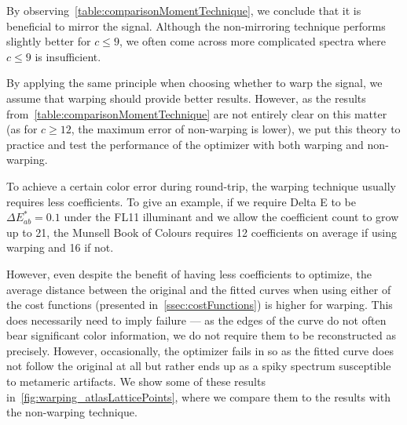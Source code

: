 By observing~\cref{table:comparisonMomentTechnique}, we conclude that it is beneficial to mirror the signal. Although the non-mirroring technique performs slightly better for $c \le 9$, we often come across more complicated spectra where $c \le 9$ is insufficient.

By applying the same principle when choosing whether to warp the signal, we assume that warping should provide better results. However, as the results from~\cref{table:comparisonMomentTechnique} are not entirely clear on this matter (as for $c \ge 12$, the maximum error of non-warping is lower), we put this theory to practice and test the performance of the optimizer with both warping and non-warping. 

To achieve a certain color error during round-trip, the warping technique usually requires less coefficients. To give an example, if we require Delta E to be $\Delta E_{ab}^*=0.1$ under the FL11 illuminant and we allow the coefficient count to grow up to 21, the Munsell Book of Colours requires 12 coefficients on average if using warping and 16 if not.

However, even despite the benefit of having less coefficients to optimize, the average distance between the original and the fitted curves when using either of the cost functions (presented in~\cref{ssec:costFunctions}) is higher for warping. This does necessarily need to imply failure --- as the edges of the curve do not often bear significant color information, we do not require them to be reconstructed as precisely. However, occasionally, the optimizer fails in so as the fitted curve does not follow the original at all but rather ends up as a spiky spectrum susceptible to metameric artifacts. We show some of these results in~\cref{fig:warping_atlasLatticePoints}, where we compare them to the results with the non-warping technique.

